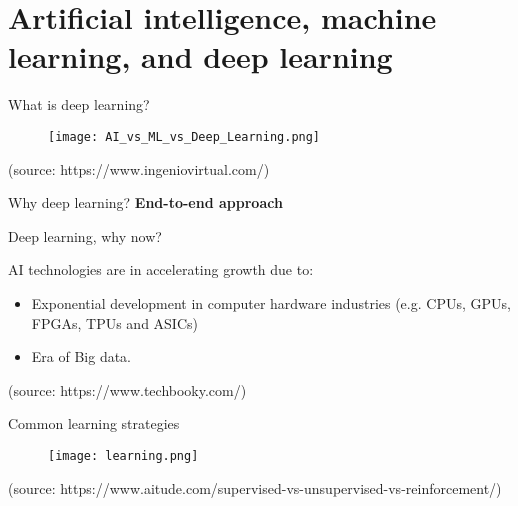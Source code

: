 \documentclass[10pt,aspectratio=169]{beamer} %
\begin{document}
\setcounter{subfigure}{0}
\section{Artificial intelligence, machine learning, and deep learning}
\begin{frame}{What is deep learning?}
	\begin{figure}
		\centering
		\texttt{[image: AI\_vs\_ML\_vs\_Deep\_Learning.png]}
	\end{figure}
	\tiny
	(source: https://www.ingeniovirtual.com/)
\end{frame}
\begin{frame}{Why deep learning?}
	\centering
	\textbf{End-to-end approach} 
	\par\medskip
\end{frame}
\setcounter{subfigure}{0}
\begin{frame}{Deep learning, why now?}
	\begin{minipage}[c]{0.4\textwidth}
		AI technologies are in accelerating growth due to:
		\begin{itemize}
			\item Exponential development in computer hardware industries
			 (e.g. CPUs, GPUs, FPGAs, TPUs and ASICs)
			\item Era of Big data.
		\end{itemize}
	\end{minipage}
	\begin{minipage}[c]{0.55\textwidth}
		\begin{figure}
			\centering
		\end{figure}
	\tiny
	(source: https://www.techbooky.com/)
	\end{minipage}
	
\end{frame}
\setcounter{subfigure}{0}
\begin{frame}{Common learning strategies}
	\centering
	\begin{figure}
		\texttt{[image: learning.png]}
	\end{figure}
	\tiny
	(source: https://www.aitude.com/supervised-vs-unsupervised-vs-reinforcement/)
\end{frame}
\end{document}
